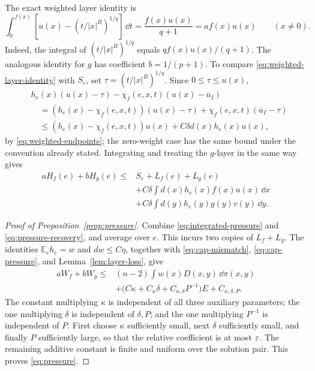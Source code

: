 The exact weighted layer identity is
\begin{equation}\label{eq:weighted-layer-identity}
 \int_0^{f(x)}\left[u(x)-(t/|x|^B)^{1/q}\right]\,\dd t
 =\frac{f(x)u(x)}{q+1}=a f(x)u(x)\qquad(x\ne0).
\end{equation}
Indeed, the integral of $(t/|x|^B)^{1/q}$ equals
$qf(x)u(x)/(q+1)$.  The analogous identity for $g$ has coefficient
$b=1/(p+1)$.
To compare \eqref{eq:weighted-layer-identity} with $S_e$, set
$\tau=(t/|x|^B)^{1/q}$.  Since $0\le\tau\le u(x)$,
\begin{align*}
 &h_e(x)(u(x)-\tau)-\chi_f(e,x,t)(u(x)-\overline u_I)\\
 &\quad=(h_e(x)-\chi_f(e,x,t))(u(x)-\tau)
                  +\chi_f(e,x,t)(\overline u_I-\tau)\\
 &\quad\le(h_e(x)-\chi_f(e,x,t))u(x)
                  +C\delta d(x)h_e(x)u(x),
\end{align*}
by \eqref{eq:weighted-endpoints}; the zero-weight case has the same
bound under the convention already stated.  Integrating and treating
the $g$-layer in the same way gives
\begin{equation}\label{eq:pressure-recovery}
\begin{split}
 aH_f(e)+bH_g(e)
 \le{}&S_e+L_f(e)+L_g(e)\\
       &+C\delta\int d(x)h_e(x)f(x)u(x)\,\dd x\\
       &+C\delta\int d(y)h_e(y)g(y)v(y)\,\dd y.
\end{split}
\end{equation}

\begin{proof}[Proof of Proposition~\ref{prop:pressure}]
Combine \eqref{eq:integrated-pressure} and
\eqref{eq:pressure-recovery}, and average over $e$.  This incurs
two copies of $L_f+L_g$.  The identities
$\mathbb E_e h_e=w$ and $dw\le C\eta$, together with
\eqref{eq:cap-mismatch}, \eqref{eq:cap-pressure}, and
Lemma~\ref{lem:layer-loss}, give
\[
\begin{split}
 aW_f+bW_g\le{}&(n-2)\int w(x)D(x,y)\,\dd\pi(x,y)\\
 &+\bigl(C\kappa+C_\kappa\delta
                    +C_{\kappa,\delta}P^{-1}\bigr)E
   +C_{\kappa,\delta,P}.
\end{split}
\]
The constant multiplying $\kappa$ is independent of all three
auxiliary parameters; the one multiplying $\delta$ is independent
of $\delta,P$; and the one multiplying $P^{-1}$ is independent of
$P$.  First choose $\kappa$ sufficiently small, next $\delta$
sufficiently small, and finally $P$ sufficiently large, so that
the relative coefficient is at most $\varepsilon$.  The remaining
additive constant is finite and uniform over the solution pair.
This proves \eqref{eq:pressure}.
\end{proof}

